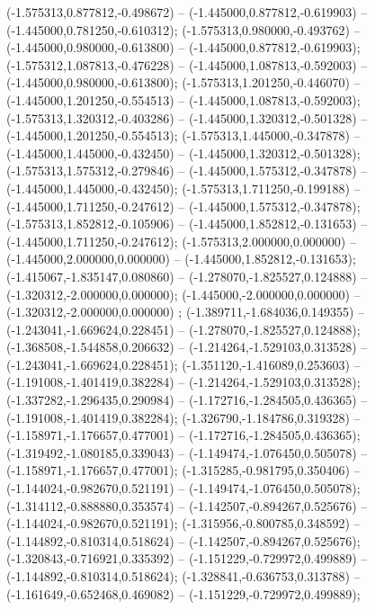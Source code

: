  (-1.575313,0.877812,-0.498672) -- (-1.445000,0.877812,-0.619903) -- (-1.445000,0.781250,-0.610312);
 (-1.575313,0.980000,-0.493762) -- (-1.445000,0.980000,-0.613800) -- (-1.445000,0.877812,-0.619903);
 (-1.575312,1.087813,-0.476228) -- (-1.445000,1.087813,-0.592003) -- (-1.445000,0.980000,-0.613800);
 (-1.575313,1.201250,-0.446070) -- (-1.445000,1.201250,-0.554513) -- (-1.445000,1.087813,-0.592003);
 (-1.575313,1.320312,-0.403286) -- (-1.445000,1.320312,-0.501328) -- (-1.445000,1.201250,-0.554513);
 (-1.575313,1.445000,-0.347878) -- (-1.445000,1.445000,-0.432450) -- (-1.445000,1.320312,-0.501328);
 (-1.575313,1.575312,-0.279846) -- (-1.445000,1.575312,-0.347878) -- (-1.445000,1.445000,-0.432450);
 (-1.575313,1.711250,-0.199188) -- (-1.445000,1.711250,-0.247612) -- (-1.445000,1.575312,-0.347878);
 (-1.575313,1.852812,-0.105906) -- (-1.445000,1.852812,-0.131653) -- (-1.445000,1.711250,-0.247612);
 (-1.575313,2.000000,0.000000) -- (-1.445000,2.000000,0.000000) -- (-1.445000,1.852812,-0.131653);
 (-1.415067,-1.835147,0.080860) -- (-1.278070,-1.825527,0.124888) -- (-1.320312,-2.000000,0.000000);
 (-1.445000,-2.000000,0.000000) -- (-1.320312,-2.000000,0.000000) ;
 (-1.389711,-1.684036,0.149355) -- (-1.243041,-1.669624,0.228451) -- (-1.278070,-1.825527,0.124888);
 (-1.368508,-1.544858,0.206632) -- (-1.214264,-1.529103,0.313528) -- (-1.243041,-1.669624,0.228451);
 (-1.351120,-1.416089,0.253603) -- (-1.191008,-1.401419,0.382284) -- (-1.214264,-1.529103,0.313528);
 (-1.337282,-1.296435,0.290984) -- (-1.172716,-1.284505,0.436365) -- (-1.191008,-1.401419,0.382284);
 (-1.326790,-1.184786,0.319328) -- (-1.158971,-1.176657,0.477001) -- (-1.172716,-1.284505,0.436365);
 (-1.319492,-1.080185,0.339043) -- (-1.149474,-1.076450,0.505078) -- (-1.158971,-1.176657,0.477001);
 (-1.315285,-0.981795,0.350406) -- (-1.144024,-0.982670,0.521191) -- (-1.149474,-1.076450,0.505078);
 (-1.314112,-0.888880,0.353574) -- (-1.142507,-0.894267,0.525676) -- (-1.144024,-0.982670,0.521191);
 (-1.315956,-0.800785,0.348592) -- (-1.144892,-0.810314,0.518624) -- (-1.142507,-0.894267,0.525676);
 (-1.320843,-0.716921,0.335392) -- (-1.151229,-0.729972,0.499889) -- (-1.144892,-0.810314,0.518624);
 (-1.328841,-0.636753,0.313788) -- (-1.161649,-0.652468,0.469082) -- (-1.151229,-0.729972,0.499889);
